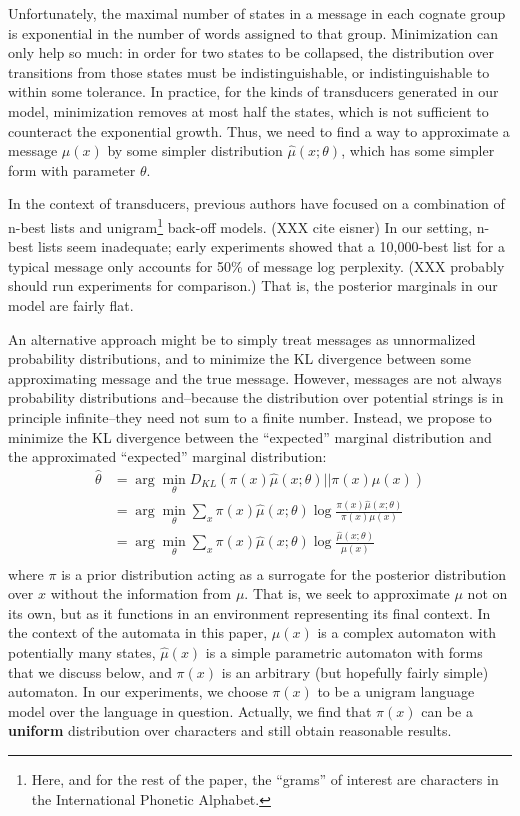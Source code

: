 \documentclass[11pt,a4paper]{article}
\begin{document}
Unfortunately, the maximal number of states in a message in each
cognate group is exponential in the number of words assigned to
that group. Minimization can only help so much: in order for two
states to be collapsed, the distribution over transitions from those
states must be indistinguishable, or indistinguishable to within
some tolerance. In practice, for the kinds of transducers generated
in our model, minimization removes at most half the states, which
is not sufficient to counteract the exponential growth. Thus, we
need to find a way to approximate a message $\mu(x)$ by some simpler
distribution $\hat\mu(x;\theta)$, which has some simpler form with
parameter $\theta$.

In the context of transducers, previous authors have focused on a
combination of n-best lists and unigram\footnote{Here, and for the
rest of the paper, the ``grams'' of interest are characters in the
International Phonetic Alphabet.} back-off models. (XXX cite eisner)
In our setting, n-best lists seem inadequate; early experiments
showed that a 10,000-best list for a typical message only accounts
for 50\% of message log perplexity. (XXX probably should run
experiments for comparison.) That is, the posterior marginals in
our model are fairly flat.

An alternative approach might be to simply treat messages as
unnormalized probability distributions, and to minimize the KL
divergence between some approximating message and the true message.
However, messages are not always probability distributions and--because
the distribution over potential strings is in principle infinite--they
need not sum to a finite number. Instead, we propose to minimize
the KL divergence between the ``expected'' marginal distribution
and the approximated ``expected'' marginal distribution:
\begin{equation}
  \begin{split}
    \hat\theta &= \arg\!\min_{\theta} D_{KL}(\pi(x)\hat\mu(x;\theta)||\pi(x)\mu(x) ) \\
    &= \arg\!\min_{\theta} \sum_x \pi(x) \hat\mu(x;\theta) \log \frac{\pi(x)\hat\mu(x;\theta)}{\pi(x)\mu(x)} \\
    &= \arg\!\min_{\theta} \sum_x \pi(x) \hat\mu(x;\theta) \log \frac{\hat\mu(x;\theta)}{\mu(x)} \\
   \end{split}
 \end{equation}
where $\pi$ is a prior distribution acting as a surrogate for the posterior
distribution over $x$ without the information from $\mu$. That is, we 
seek to approximate $\mu$ not on its own, but as it functions in
an environment representing its final context. In the context of
the automata in this paper, $\mu(x)$ is a complex automaton with
potentially many states, $\hat\mu(x)$ is a simple parametric automaton
with forms that we discuss below, and $\pi(x)$ is an arbitrary (but
hopefully fairly simple) automaton. In our experiments, we choose
$\pi(x)$ to be a unigram language model over the language in question.
Actually, we find that $\pi(x)$ can be a \textbf{uniform} distribution
over characters and still obtain reasonable results.
\end{document}
